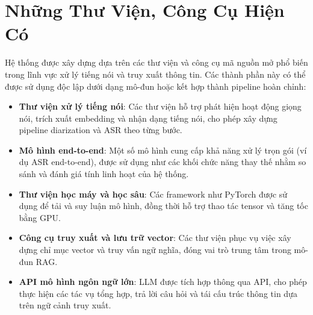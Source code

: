 \section{Những Thư Viện, Công Cụ Hiện Có}

Hệ thống được xây dựng dựa trên các thư viện và công cụ mã nguồn mở phổ biến trong lĩnh vực xử lý tiếng nói và truy xuất thông tin. Các thành phần này có thể được sử dụng độc lập dưới dạng mô-đun hoặc kết hợp thành pipeline hoàn chỉnh:
\begin{itemize}[label={}]
    \item \textbf{Thư viện xử lý tiếng nói}: Các thư viện hỗ trợ phát hiện hoạt động giọng nói, trích xuất embedding và nhận dạng tiếng nói, cho phép xây dựng pipeline diarization và ASR theo từng bước.
    \item \textbf{Mô hình end-to-end}: Một số mô hình cung cấp khả năng xử lý trọn gói (ví dụ ASR end-to-end), được sử dụng như các khối chức năng thay thế nhằm so sánh và đánh giá tính linh hoạt của hệ thống.
    \item \textbf{Thư viện học máy và học sâu}: Các framework như PyTorch được sử dụng để tải và suy luận mô hình, đồng thời hỗ trợ thao tác tensor và tăng tốc bằng GPU.
    \item \textbf{Công cụ truy xuất và lưu trữ vector}: Các thư viện phục vụ việc xây dựng chỉ mục vector và truy vấn ngữ nghĩa, đóng vai trò trung tâm trong mô-đun RAG.
    \item \textbf{API mô hình ngôn ngữ lớn}: LLM được tích hợp thông qua API, cho phép thực hiện các tác vụ tổng hợp, trả lời câu hỏi và tái cấu trúc thông tin dựa trên ngữ cảnh truy xuất.
\end{itemize}